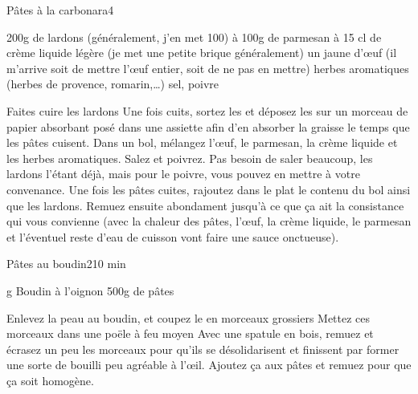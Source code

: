 \begin{recette}{Pâtes à la carbonara}{4}{}{}
\begin{ingredients}
\ingredient 200g de lardons (généralement, j'en met 100)
 à 100g de parmesan
 à 15 cl de crème liquide légère (je met une petite brique généralement)
\ingredient un jaune d'œuf (il m'arrive soit de mettre l'œuf entier, soit de ne pas en mettre)
\ingredient herbes aromatiques (herbes de provence, romarin,\dots)
\ingredient sel, poivre
\end{ingredients}

\begin{preparation}
\etape Faites cuire les lardons
\etape Une fois cuits, sortez les et déposez les sur un morceau de papier absorbant posé dans une assiette afin d'en absorber la graisse le temps que les pâtes cuisent.
\etape Dans un bol, mélangez l'œuf, le parmesan, la crème liquide et les herbes aromatiques. Salez et poivrez. Pas besoin de saler beaucoup, les lardons l'étant déjà, mais pour le poivre, vous pouvez en mettre à votre convenance.
\etape Une fois les pâtes cuites, rajoutez dans le plat le contenu du bol ainsi que les lardons. Remuez ensuite abondament jusqu'à ce que ça ait la consistance qui vous convienne (avec la chaleur des pâtes, l'œuf, la crème liquide, le parmesan et l'éventuel reste d'eau de cuisson vont faire une sauce onctueuse).
\end{preparation}

\end{recette}

\begin{recette}{Pâtes au boudin}{2}{10 min}{}
\begin{ingredients}
 g Boudin à l'oignon
\ingredient 500g de pâtes
\end{ingredients}

\begin{preparation}
\etape Enlevez la peau au boudin, et coupez le en morceaux grossiers
\etape Mettez ces morceaux dans une poële à feu moyen
\etape Avec une spatule en bois, remuez et écrasez un peu les morceaux pour qu'ils se désolidarisent et finissent par former une sorte de bouilli peu agréable à l'œil.
\etape Ajoutez ça aux pâtes et remuez pour que ça soit homogène.
\end{preparation}

\end{recette}


